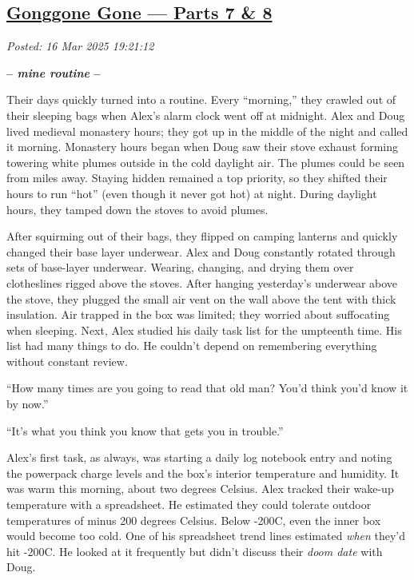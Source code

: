 %

\subsection*{\href{http://analyzethedatanotthedrivel.org/2025/03/16/gonggone-gone-parts-7-8/}{Gonggone Gone --- Parts 7 \& 8}}


\noindent\emph{Posted: 16 Mar 2025 19:21:12}
\vspace{6pt}

\begin{center}\large\textbf{-- \emph{mine routine} --}\normalsize\end{center}

Their days quickly turned into a routine. Every ``morning,'' they
crawled out of their sleeping bags when Alex's alarm clock went off at
midnight. Alex and Doug lived medieval monastery hours; they got up in
the middle of the night and called it morning. Monastery hours began
when Doug saw their stove exhaust forming towering white plumes outside
in the cold daylight air. The plumes could be seen from miles away.
Staying hidden remained a top priority, so they shifted their hours to
run ``hot'' (even though it never got hot) at night. During daylight
hours, they tamped down the stoves to avoid plumes.

After squirming out of their bags, they flipped on camping lanterns and
quickly changed their base layer underwear. Alex and Doug constantly
rotated through sets of base-layer underwear. Wearing, changing, and
drying them over clotheslines rigged above the stoves. After hanging
yesterday's underwear above the stove, they plugged the small air vent
on the wall above the tent with thick insulation. Air trapped in the box
was limited; they worried about suffocating when sleeping. Next, Alex
studied his daily task list for the umpteenth time. His list had many
things to do. He couldn't depend on remembering everything without
constant review.

``How many times are you going to read that old man? You'd think you'd
know it by now.''

``It's what you think you know that gets you in trouble.''

Alex's first task, as always, was starting a daily log notebook entry
and noting the powerpack charge levels and the box's interior
temperature and humidity. It was warm this morning, about two degrees
Celsius. Alex tracked their wake-up temperature with a spreadsheet. He
estimated they could tolerate outdoor temperatures of minus 200 degrees
Celsius. Below -200C, even the inner box would become too cold. One of
his spreadsheet trend lines estimated \emph{when} they'd hit -200C. He
looked at it frequently but didn't discuss their \emph{doom date} with
Doug.

